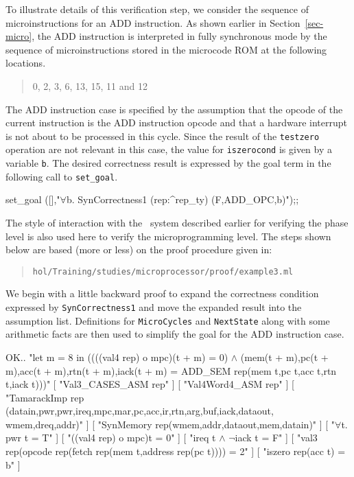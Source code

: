 To illustrate details of this verification step,
we consider the sequence of microinstructions for an ADD instruction.
As shown earlier in Section~\ref{sec-micro},
the ADD instruction is interpreted in fully synchronous mode
by the sequence of
microinstructions stored in the microcode ROM at the following
locations.

\begin{quote}
0, 2, 3, 6, 13, 15, 11 and 12
\end{quote}

The ADD instruction case is specified by the assumption that
the opcode of the current instruction is the ADD instruction opcode
and that a hardware interrupt is not about to be processed in this cycle.
Since the result of the \verb"testzero" operation are not relevant in
this case, the value for \verb"iszerocond"
is given by a variable \verb"b".
The desired correctness result is expressed by the goal term in
the following call to \verb"set_goal".

\begintt
set_goal ([],"\(\forall\)b. SynCorrectness1 (rep:^rep_ty) (F,ADD_OPC,b)");;
\endtt

The style of interaction with the \HOL\ system described earlier
for verifying the phase level is also used here
to verify the microprogramming level.
The steps shown below are based (more or less)
on the proof procedure given in:

\begin{quote}
\verb"hol/Training/studies/microprocessor/proof/example3.ml"
\end{quote}

We begin with a little backward proof to expand the
correctness condition expressed by \verb"SynCorrectness1"
and move the expanded result
into the assumption list.
Definitions for \verb"MicroCycles" and \verb"NextState"
along with some arithmetic facts are
then used to simplify the goal for the ADD instruction case.

\begintt
OK..
"let m = 8
 in
  ((((val4 rep) o mpc)(t + m) = 0) \(\wedge\)
   (mem(t + m),pc(t + m),acc(t + m),rtn(t + m),iack(t + m) =
    ADD_SEM rep(mem t,pc t,acc t,rtn t,iack t)))"
    [ "Val3_CASES_ASM rep" ]
    [ "Val4Word4_ASM rep" ]
    [ "TamarackImp 
       rep
       (datain,pwr,pwr,ireq,mpc,mar,pc,acc,ir,rtn,arg,buf,iack,dataout,
        wmem,dreq,addr)" ]
    [ "SynMemory rep(wmem,addr,dataout,mem,datain)" ]
    [ "\(\forall\)t. pwr t = T" ]
    [ "((val4 rep) o mpc)t = 0" ]
    [ "ireq t \(\wedge\) \(\neg\)iack t = F" ]
    [ "val3 rep(opcode rep(fetch rep(mem t,address rep(pc t)))) = 2" ]
    [ "iszero rep(acc t) = b" ]

